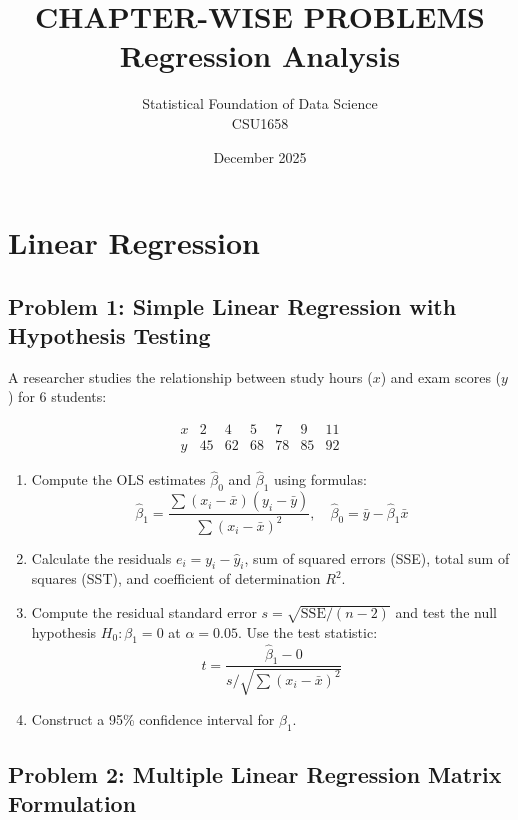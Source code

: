 \documentclass[12pt]{article}
\title{CHAPTER-WISE PROBLEMS\\
\large Regression Analysis}
\author{Statistical Foundation of Data Science\\
CSU1658}
\date{December 2025}
\begin{document}
\maketitle

\tableofcontents
\newpage


\section{Linear Regression}

\subsection*{Problem 1: Simple Linear Regression with Hypothesis Testing}

A researcher studies the relationship between study hours (\(x\)) and exam scores (\(y\)) for 6 students:

\[
\begin{array}{c|cccccc}
x & 2 & 4 & 5 & 7 & 9 & 11 \\
\hline
y & 45 & 62 & 68 & 78 & 85 & 92
\end{array}
\]

\begin{enumerate}[label=(\alph*)]
\item Compute the OLS estimates \(\hat{\beta}_0\) and \(\hat{\beta}_1\) using formulas:
\[
\hat{\beta}_1 = \frac{\sum(x_i - \bar{x})(y_i - \bar{y})}{\sum(x_i - \bar{x})^2}, \quad \hat{\beta}_0 = \bar{y} - \hat{\beta}_1\bar{x}
\]

\item Calculate the residuals \(e_i = y_i - \hat{y}_i\), sum of squared errors (SSE), total sum of squares (SST), and coefficient of determination \(R^2\).

\item Compute the residual standard error \(s = \sqrt{\text{SSE}/(n-2)}\) and test the null hypothesis \(H_0: \beta_1 = 0\) at \(\alpha = 0.05\). Use the test statistic:
\[
t = \frac{\hat{\beta}_1 - 0}{s/\sqrt{\sum(x_i - \bar{x})^2}}
\]

\item Construct a 95\% confidence interval for \(\beta_1\).
\end{enumerate}

\subsection*{Problem 2: Multiple Linear Regression Matrix Formulation}
\end{document}
